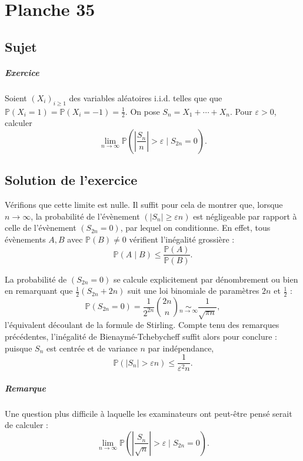 \chapter{Planche 35}

\section{Sujet}

\paragraph{Exercice}
Soient $(X_i)_{i\geqslant 1}$ des variables aléatoires i.i.d. telles que que $\mathbb P(X_i = 1) = \mathbb P(X_i = -1) = \frac12.$
On pose $S_n = X_1 + \cdots + X_n$.
Pour $\varepsilon > 0$, calculer
\[
\lim_{n\to\infty} \mathbb P\left(\left|\frac{S_n}n\right| > \varepsilon \mid S_{2n} = 0\right).
\]

\section{Solution de l'exercice}
Vérifions que cette limite est nulle.
Il suffit pour cela de montrer que, lorsque $n \to \infty$, la probabilité de l'évènement $(|S_n| \geq \varepsilon n)$ est négligeable par rapport à celle de l'évènement $(S_{2n} = 0)$, par lequel on conditionne. En effet, tous évènements $A,B$ avec $\mathbb P(B) \neq 0$ vérifient l'inégalité grossière :
\[
\mathbb P(A \mid B) \leqslant \frac{\mathbb P(A)}{\mathbb P(B)}.
\]

La probabilité de $(S_{2n} = 0)$ se calcule explicitement par dénombrement ou bien en remarquant que $\frac12(S_{2n}+{2n})$ suit une loi binomiale de paramètres $2n$ et $\frac12$ :
\[
\mathbb P(S_{2n} = 0) = \frac1{2^{2n}}\binom{2n}{n} \underset{n\to\infty}{\sim} \frac 1{\sqrt{\pi n}},
\]
l'équivalent découlant de la formule de Stirling. Compte tenu des remarques précédentes, l'inégalité de Bienaymé-Tchebycheff suffit alors pour conclure : puisque $S_n$ est centrée et de variance $n$ par indépendance,
\[
 \mathbb P\left(|S_n| > \varepsilon n\right) \leqslant \frac{1}{\varepsilon^2 n}.
\]

\paragraph{Remarque}
Une question plus difficile à laquelle les examinateurs ont peut-être pensé serait de calculer :
\[
\lim_{n\to\infty} \mathbb P\left(\left|\frac{S_n}{\sqrt n}\right| > \varepsilon \mid S_{2n} = 0\right).
\]

